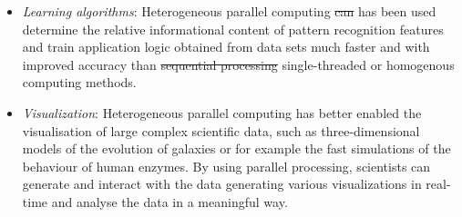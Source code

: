 \documentclass[10pt]{article}[draft]
\begin{document}
\begin{itemize}
   \item \emph{Learning algorithms}: Heterogeneous parallel computing  \st{can} has been used determine the relative informational content of pattern recognition features and train application logic obtained from data sets much faster and with improved accuracy than \st{sequential processing} single-threaded or homogenous computing methods.
   
   \item \emph{Visualization}: Heterogeneous parallel computing has better enabled the visualisation of large complex scientific data, such as three-dimensional models of the evolution of galaxies or for example the fast simulations of the behaviour of human enzymes. By using parallel processing, scientists can generate and interact with the data generating various visualizations in real-time and analyse the data in a meaningful way.


\end{itemize}
\end{document}
